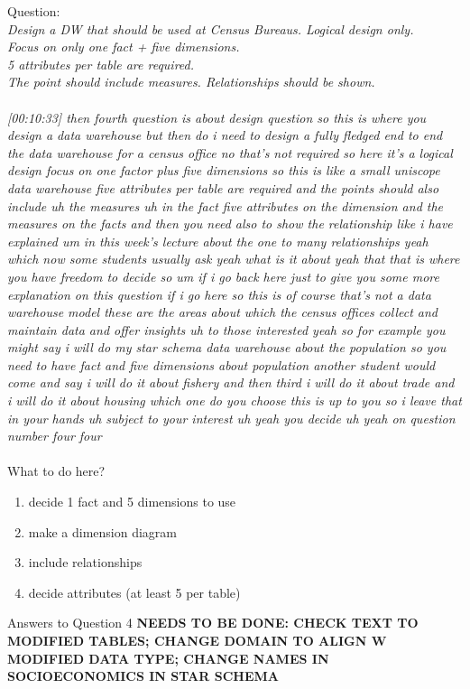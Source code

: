 Question:\\
\emph{
    Design a DW that should be used at Census Bureaus. Logical design only.\\ Focus on only
one fact + five dimensions.\\ 5 attributes per table are required.\\ The point should include
measures. Relationships should be shown.
}\\\\
\emph{[00:10:33] then fourth question is about design question so this is where you design a data warehouse but then do i need to design a fully
fledged end to end the data warehouse for a census office no that's not required so here it's a logical
design focus on one factor plus five dimensions so this is like a small uniscope data warehouse five
attributes per table are required and the points should also include uh the measures uh in the fact
five attributes on the dimension and the measures on the facts and then you need also to show the
relationship like i have explained um in this week's lecture about the one to many relationships
yeah which now some students usually ask yeah what is it about yeah that that is where you have freedom
to decide so um if i go back here just to give you some more explanation on this question if i go here
so this is of course that's not a data warehouse model these are the areas about which the census offices
collect and maintain data and offer insights uh to those interested yeah so for example you might
say i will do my star schema data warehouse about the population so you need to have
fact and five dimensions about population another student would come and say i will do it about fishery and
then third i will do it about trade and i will do it about housing which one do you choose this is up to you
so i leave that in your hands uh subject to your interest uh yeah you decide uh yeah on question number four
four}\\\\
What to do here?
\begin{enumerate}
    \item decide 1 fact and 5 dimensions to use
    \item make a dimension diagram
    \item include relationships
    \item decide attributes (at least 5 per table)
  \end{enumerate}

\newpage Answers to Question 4
\textbf{NEEDS TO BE DONE: CHECK TEXT TO MODIFIED TABLES; CHANGE DOMAIN TO ALIGN W MODIFIED DATA TYPE; CHANGE NAMES IN SOCIOECONOMICS IN STAR SCHEMA}
